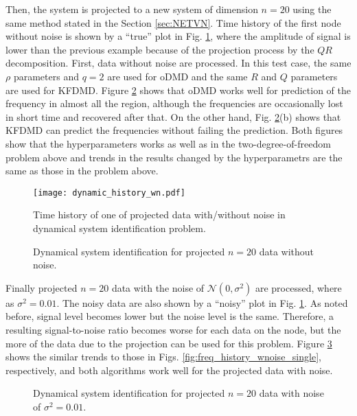 \documentclass[aip,graphicx]{revtex4-1}
\begin{document}
Then, the system is projected to a new system of dimension $n=20$ using the same method stated in the Section \ref{sec:NETVN}. Time history of the first node without noise is shown by a ``true'' plot in Fig. \ref{fig:dynamic_history_wn}, where the amplitude of signal is lower than the previous example because of the projection process by the $QR$ decomposition. First, data without noise are processed. In this test case, the same $\rho$ parameters and $q=2$ are used for oDMD and the same $R$ and $Q$ parameters are used for KFDMD. Figure \ref{fig:freq_history_wonoise} shows that oDMD works well for prediction of the frequency in almost all the region, although the frequencies are occasionally lost in short time and recovered after that. On the other hand, Fig. \ref{fig:freq_history_wonoise}(b) shows that KFDMD can predict the frequencies without failing the prediction. Both figures show that the hyperparameters works as well as in the two-degree-of-freedom problem above and trends in the results changed by the hyperparametrs are the same as those in the problem above.

\begin{figure}
	\texttt{[image: dynamic\_history\_wn.pdf]}
	\caption{Time history of one of projected data with/without noise in dynamical system identification problem.}
	\label{fig:dynamic_history_wn}
\end{figure}

\begin{figure}
	\caption{Dynamical system identification for projected $n=20$ data without noise.}
	\label{fig:freq_history_wonoise}
\end{figure}

Finally projected $n=20$ data with the noise of $\mathcal{N}(0,\sigma^2)$ are processed, where as $\sigma^2=0.01$. The noisy data are also shown by a ``noisy'' plot in Fig. \ref{fig:dynamic_history_wn}. As noted before, signal level becomes lower but the noise level is the same. Therefore, a resulting signal-to-noise ratio becomes worse for each data on the node, but the more of the data due to the projection can be used for this problem. Figure \ref{fig:freq_history_wnoise} shows the similar trends to those in Figs. \ref{fig:freq_history_wnoise_single}, respectively, and both algorithms work well for the projected data with noise.  

\begin{figure}
	\caption{Dynamical system identification for projected $n=20$ data with noise of $\sigma^2=0.01$.}
	\label{fig:freq_history_wnoise}
\end{figure}
\end{document}
